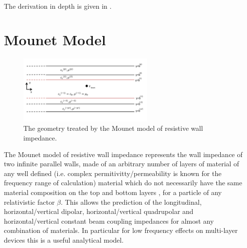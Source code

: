 The derivation in depth is given in \cite{Zannini:cCoreFerrite}.

\section{Mounet Model}

\begin{figure}
\begin{center}
\includegraphics[width=0.6\textwidth]{appendices/figures/mounet-model.pdf}
\end{center}
\caption{The geometry treated by the Mounet model of resistive wall impedance.}
\label{fig:MounetGeo}
\end{figure}

The Mounet model of resistive wall impedance represents the wall impedance of two infinite parallel walls, made of an arbitrary number of layers of material of any well defined (i.e. complex permitivitty/permeability is known for the frequency range of calculation) material which do not necessarily have the same material composition on the top and bottom layers \cite{Mounet:PhDThesis}, for a particle of any relativistic factor $\beta$. This allows the prediction of the longitudinal, horizontal/vertical dipolar, horizontal/vertical quadrupolar and horizontal/vertical constant beam coupling impedances for almost any combination of materials. In particular for low frequency effects on multi-layer devices this is a useful analytical model. 